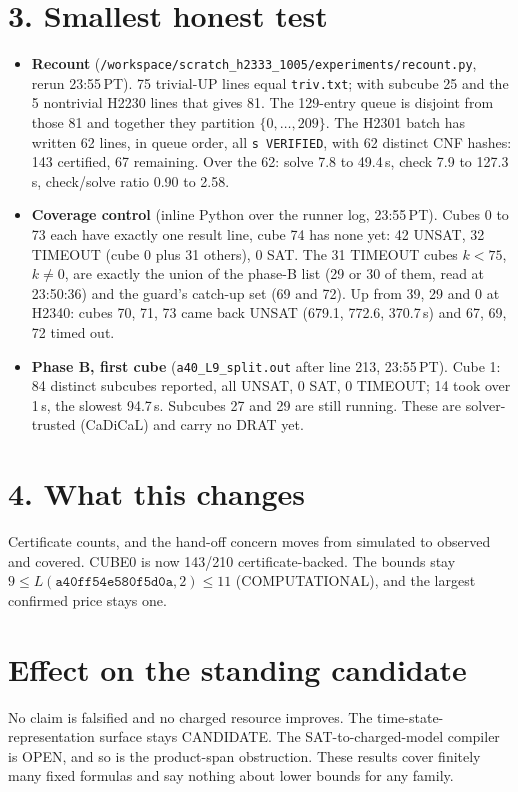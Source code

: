\documentclass[11pt]{article}
\begin{document}
\section*{3. Smallest honest test}
\begin{itemize}
\item \textbf{Recount} (\texttt{/workspace/scratch\_h2333\_1005/experiments/recount.py}, rerun 23:55\,PT). 75 trivial-UP lines equal \texttt{triv.txt}; with subcube 25 and the 5 nontrivial H2230 lines that gives 81. The 129-entry queue is disjoint from those 81 and together they partition $\{0,\dots,209\}$. The H2301 batch has written 62 lines, in queue order, all \texttt{s VERIFIED}, with 62 distinct CNF hashes: 143 certified, 67 remaining. Over the 62: solve 7.8 to 49.4\,s, check 7.9 to 127.3\,s, check/solve ratio 0.90 to 2.58.
\item \textbf{Coverage control} (inline Python over the runner log, 23:55\,PT). Cubes 0 to 73 each have exactly one result line, cube 74 has none yet: 42 UNSAT, 32 TIMEOUT (cube 0 plus 31 others), 0 SAT. The 31 TIMEOUT cubes $k<75$, $k\ne0$, are exactly the union of the phase-B list (29 or 30 of them, read at 23:50:36) and the guard's catch-up set (69 and 72). Up from 39, 29 and 0 at H2340: cubes 70, 71, 73 came back UNSAT (679.1, 772.6, 370.7\,s) and 67, 69, 72 timed out.
\item \textbf{Phase B, first cube} (\texttt{a40\_L9\_split.out} after line 213, 23:55\,PT). Cube 1: 84 distinct subcubes reported, all UNSAT, 0 SAT, 0 TIMEOUT; 14 took over 1\,s, the slowest 94.7\,s. Subcubes 27 and 29 are still running. These are solver-trusted (CaDiCaL) and carry no DRAT yet.
\end{itemize}

\section*{4. What this changes}
Certificate counts, and the hand-off concern moves from simulated to observed and covered. CUBE0 is now 143/210 certificate-backed. The bounds stay $9\le L(\texttt{a40ff54e580f5d0a},2)\le 11$ (COMPUTATIONAL), and the largest confirmed price stays one.

\section*{Effect on the standing candidate}
No claim is falsified and no charged resource improves. The time-state-representation surface stays CANDIDATE. The SAT-to-charged-model compiler is OPEN, and so is the product-span obstruction. These results cover finitely many fixed formulas and say nothing about lower bounds for any family.
\end{document}
